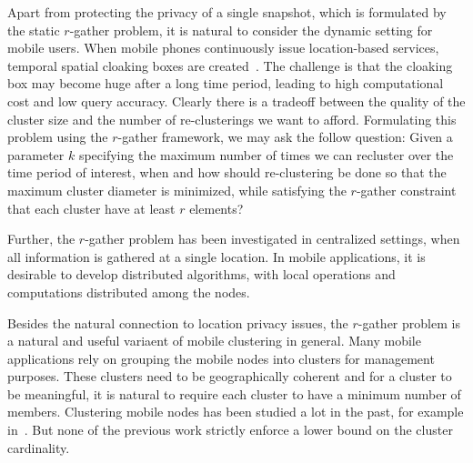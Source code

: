 Apart from protecting the privacy of a single snapshot, which is formulated by the static $r$-gather problem, it is natural to consider the dynamic setting for mobile users. 
When mobile phones continuously issue location-based services, temporal spatial cloaking boxes are created~\cite{Chow:2007:EPC:1784462.1784477,Xu:2007:LAC:1341012.1341062,4509698}. The challenge is that the cloaking box may become huge after a long time period, leading to high computational cost and low query accuracy. Clearly there is a tradeoff between the quality of the cluster size and the number of re-clusterings we want to afford. Formulating this problem using the $r$-gather framework, we may ask the follow question: Given a parameter $k$ specifying the maximum number of times we can recluster over the time period of interest, when and how should re-clustering be done so that the maximum cluster diameter is minimized, while satisfying the $r$-gather constraint that each cluster have at least $r$ elements?

Further, the $r$-gather problem has been investigated in centralized settings, when all information is gathered at a single location. In mobile applications, it is desirable to  develop distributed algorithms, with local operations and computations distributed among the nodes. 

Besides the natural connection to location privacy issues, the $r$-gather problem is a natural and useful variaent of mobile clustering in general. Many mobile applications rely on grouping the mobile nodes into clusters for management purposes. These clusters need to be geographically coherent and for a cluster to be meaningful, it is natural to require each cluster to have a minimum number of members. Clustering mobile nodes has been studied a lot in the past, for example in~\cite{593002,lin97adaptive,chen99clustering,basu01mobility,Basagni99distributed,gghzz-dmc-03}. But none of the previous work strictly enforce a lower bound on the cluster cardinality. 

